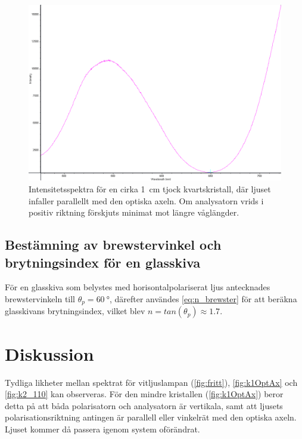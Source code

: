 \documentclass[a4paper]{article}
\begin{document}
\FloatBarrier
\begin{figure}[ht!]
	\centering
	\includegraphics[width=\linewidth]{data/spektra_aktiv2_inv}
	\caption{Intensitetsspektra för en cirka \SI{1}{\centi\m} tjock kvartskristall, där ljuset infaller parallellt med den optiska axeln. Om analysatorn vrids i positiv riktning förskjuts minimat mot längre våglängder.}
	\label{fig:aktiv3}
\end{figure}
\FloatBarrier

\subsection{Bestämning av brewstervinkel och brytningsindex för en glasskiva}

För en glasskiva som belystes med horisontalpolariserat ljus antecknades brewstervinkeln till $\theta_p = \SI{60}{\degree}$, därefter användes \eqref{eq:n_brewster} för att beräkna glasskivans brytningsindex, vilket blev $n = tan(\theta_p) \approx 1.7$.


\section{Diskussion}


Tydliga likheter mellan spektrat för vitljuslampan (\autoref{fig:fritt}), \autoref{fig:k1OptAx} och \autoref{fig:k2_110} kan observeras. För den mindre kristallen (\autoref{fig:k1OptAx}) beror detta på att båda polarisatorn och analysatorn är vertikala, samt att ljusets polarisationsriktning antingen är parallell eller vinkelrät med den optiska axeln. Ljuset kommer då passera igenom system oförändrat.
\end{document}
